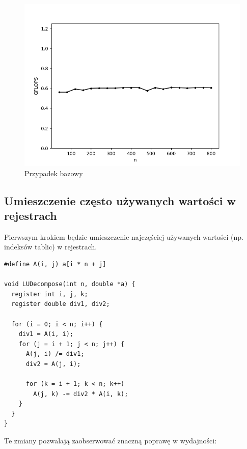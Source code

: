 \documentclass{article}
\begin{document}
\begin{figure}[H]
    \centering
    \includegraphics[width=1.0\textwidth]{figures/fig0.png}
    \caption{Przypadek bazowy}
\end{figure}

\subsection{Umieszczenie często używanych wartości w rejestrach}

Pierwszym krokiem będzie umieszczenie najczęściej używanych wartości (np. indeksów tablic)
w rejestrach.

\begin{verbatim}
#define A(i, j) a[i * n + j]

void LUDecompose(int n, double *a) {
  register int i, j, k; 
  register double div1, div2;

  for (i = 0; i < n; i++) {
    div1 = A(i, i);
    for (j = i + 1; j < n; j++) {
      A(j, i) /= div1;
      div2 = A(j, i);

      for (k = i + 1; k < n; k++)
        A(j, k) -= div2 * A(i, k);
    }
  }
}
\end{verbatim}

Te zmiany pozwalają zaobserwować znaczną poprawę w wydajności:
\end{document}
